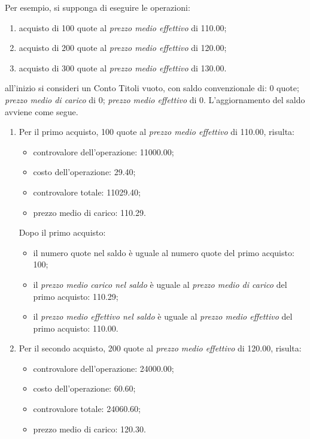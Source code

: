 \documentclass[12pt,a4paper]{article}
\newcommand{\Eur}[1]{\SI{#1}{\text{\euro{}}}}
\begin{document}
Per esempio, si supponga di eseguire le operazioni:
\begin{enumerate}
\item acquisto di \num{100} quote al \emph{prezzo medio effettivo} di \Eur{110,00};
\item acquisto di \num{200} quote al \emph{prezzo medio effettivo} di \Eur{120,00};
\item acquisto di \num{300} quote al \emph{prezzo medio effettivo} di \Eur{130,00}.
\end{enumerate}
all'inizio si  consideri un Conto Titoli  vuoto, con saldo convenzionale  di: \num{0}
quote; \emph{prezzo  medio di  carico} di \Eur{0};  \emph{prezzo medio  effettivo} di
\Eur{0}.  L'aggiornamento del saldo avviene come segue.
\begin{enumerate}
\item Per  il primo  acquisto, \num{100}  quote al  \emph{prezzo medio  effettivo} di
  \Eur{110,00}, risulta:
  \begin{itemize}
  \item controvalore dell'operazione: \Eur{11000,00};
  \item costo dell'operazione: \Eur{29,40};
  \item controvalore totale: \Eur{11029,40};
  \item prezzo medio di carico: \Eur{110,29}.
  \end{itemize}

  Dopo il primo acquisto:
  \begin{itemize}
  \item  il numero  quote nel  saldo è  uguale al  numero quote  del primo  acquisto:
    \num{100};
  \item il  \emph{prezzo medio carico  nel saldo} è  uguale al \emph{prezzo  medio di
       carico} del primo acquisto: \Eur{110,29};
  \item il  \emph{prezzo medio effettivo  nel saldo}  è uguale al  \emph{prezzo medio
       effettivo} del primo acquisto: \Eur{110,00}.
  \end{itemize}

\item Per  il secondo acquisto, \num{200}  quote al \emph{prezzo medio  effettivo} di
  \Eur{120,00}, risulta:
  \begin{itemize}
    \item controvalore dell'operazione: \Eur{24000,00};
    \item costo dell'operazione: \Eur{60,60};
    \item controvalore totale: \Eur{24060,60};
    \item prezzo medio di carico: \Eur{120,30}.
  \end{itemize}


\end{enumerate}
\end{document}
